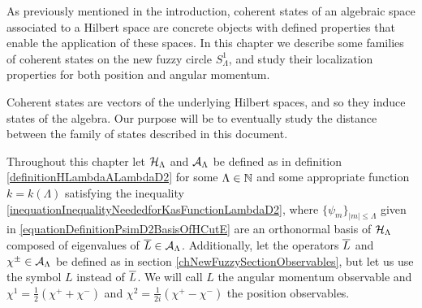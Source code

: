 










As previously mentioned in the introduction, coherent states of an algebraic space associated to a Hilbert space  are concrete objects with defined properties that enable the application of these spaces. In this chapter we describe some families of coherent states on the new fuzzy circle $S^1_\Lambda$, and study their localization properties for both position and angular momentum. 

Coherent states are vectors of the underlying Hilbert spaces, and so they induce states of the algebra. Our purpose will be to eventually study the distance between the family of states described in this document.

Throughout this chapter let $\mathcal H_\Lambda$ and $\mathcal A_\Lambda$ be defined as in definition \ref{definitionHLambdaALambdaD2} for some $\Lambda \in \mathbb{N}$ and some appropriate function $k = k(\Lambda)$ satisfying the inequality \eqref{inequationInequalityNeededforKasFunctionLambdaD2}, where $\{\psi_m\}_{|m| \leq \Lambda}$ given in \eqref{equationDefinitionPsimD2BasisOfHCutE} are an orthonormal basis of $\mathcal H_\Lambda$ composed of eigenvalues of $\overline{L} \in \mathcal A_\Lambda$. Additionally, let the operators $\overline{L}$ and $\chi^\pm \in \mathcal A_\Lambda$ be defined as in section \ref{chNewFuzzySectionObservables}, but let us use the symbol $L$ instead of $\overline{L}$. We will call $L$ the angular momentum observable and $\chi^1 = \frac{1}{2}(\chi^+ + \chi^-)$ and $\chi^2 = \frac{1}{2i}(\chi^+ - \chi^-)$ the position observables.

